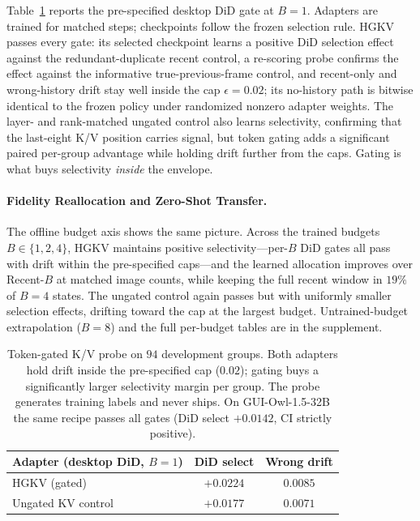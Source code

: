 \documentclass[letterpaper]{article} %
\newcommand{\hgkv}{\textsc{HGKV}}
\begin{document}
Table~\ref{tab:did-gate} reports the pre-specified desktop DiD gate at
$B{=}1$. Adapters are trained for matched steps; checkpoints follow the
frozen selection rule. \hgkv{} passes every gate: its selected checkpoint
learns a positive DiD selection effect against the redundant-duplicate
recent control, a re-scoring probe confirms the effect against the
informative true-previous-frame control, and recent-only and wrong-history
drift stay well inside the cap $\epsilon{=}0.02$; its no-history path is
bitwise identical to the frozen policy under randomized nonzero adapter
weights. The layer- and rank-matched ungated control also learns
selectivity, confirming that the last-eight K/V position carries signal,
but token gating adds a significant paired per-group advantage while
holding drift further from the caps. Gating is what buys selectivity
\emph{inside} the envelope.

\paragraph{Fidelity Reallocation and Zero-Shot Transfer.}

The offline budget axis shows the same picture. Across the trained budgets
$B\in\{1,2,4\}$, \hgkv{} maintains positive selectivity---per-$B$ DiD
gates all pass with drift within the pre-specified caps---and the learned
allocation improves over Recent-$B$ at matched image counts, while keeping
the full recent window in $19\%$ of $B{=}4$ states. The ungated control
again passes but with uniformly smaller selection effects, drifting
toward the cap at the largest budget. Untrained-budget extrapolation
($B{=}8$) and the full per-budget tables are in the supplement.

\begin{table}[t]
\centering
{\small
\setlength{\tabcolsep}{4.0pt}
\begin{tabular}{@{}lcc@{}}
\toprule
Adapter (desktop DiD, $B{=}1$) & DiD select & Wrong drift \\
\midrule
\hgkv{} (gated) & $\mathbf{+0.0224}$ & $0.0085$ \\
Ungated KV control & $+0.0177$ & $0.0071$ \\
\bottomrule
\end{tabular}
}
\caption{Token-gated K/V probe on $94$ development groups. Both adapters
hold drift inside the pre-specified cap ($0.02$); gating buys a
significantly larger selectivity margin per group. The probe generates
training labels and never ships. On GUI-Owl-1.5-32B the same recipe
passes all gates (DiD select $+0.0142$, CI strictly positive).}
\label{tab:did-gate}
\end{table}
\end{document}
